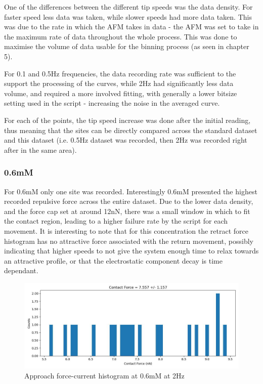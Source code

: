 One of the differences between the different tip speeds was the data density. For faster speed less data was taken, while slower speeds had more data taken. This was due to the rate in which the AFM takes in data - the AFM was set to take in the maximum rate of data throughout the whole process. This was done to maximise the volume of data usable for the binning process (as seen in chapter 5). 

For 0.1 and 0.5Hz frequencies, the data recording rate was sufficient to the support the processing of the curves, while 2Hz had significantly less data volume, and required a more involved fitting, with generally a lower bitsize setting used in the script - increasing the noise in the averaged curve.

For each of the points, the tip speed increase was done after the initial reading, thus meaning that the sites can be directly compared across the standard dataset and this dataset (i.e. 0.5Hz dataset was recorded, then 2Hz was recorded right after in the same area).

\subsubsection*{0.6mM}
For 0.6mM only one site was recorded. Interestingly 0.6mM presented the highest recorded repulsive force across the entire dataset. Due to the lower data density, and the force cap set at around 12nN, there was a small window in which to fit the contact region, leading to a higher failure rate by the script for each movement. It is interesting to note that for this concentration the retract force histogram has no attractive force associated with the return movement, possibly indicating that higher speeds to not give the system enough time to relax towards an attractive profile, or that the electrostatic component decay is time dependant.
\begin{figure}[h!]
\centering
\includegraphics[width=\textwidth]{chapter7/Tip speed/0.6mM/approach_f_c_hist.jpg}
\caption{Approach force-current histogram at 0.6mM at 2Hz}
\end{figure}


